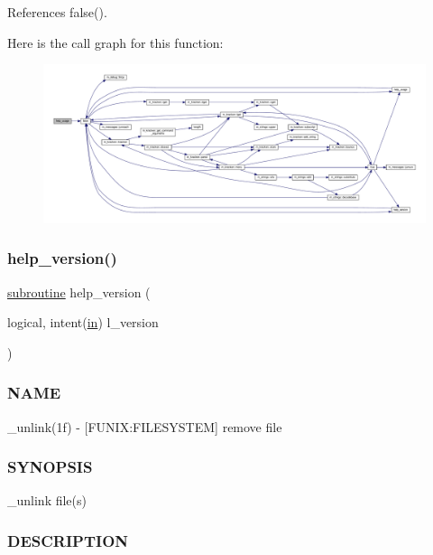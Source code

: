 References false().

Here is the call graph for this function\+:
\nopagebreak
\begin{figure}[H]
\begin{center}
\leavevmode
\includegraphics[width=350pt]{__unlink_8f90_a3e09a3b52ee8fb04eeb93fe5761626a8_cgraph}
\end{center}
\end{figure}
\mbox{\label{__unlink_8f90_a39c21619b08a3c22f19e2306efd7f766}} 
\subsubsection{\texorpdfstring{help\+\_\+version()}{help\_version()}}
{\footnotesize\ttfamily \hyperlink{M__stopwatch_83_8txt_acfbcff50169d691ff02d4a123ed70482}{subroutine} help\+\_\+version (\begin{DoxyParamCaption}\item[{logical, intent(\hyperlink{M__journal_83_8txt_afce72651d1eed785a2132bee863b2f38}{in})}]{l\+\_\+version }\end{DoxyParamCaption})}



\subsubsection*{N\+A\+ME}

\+\_\+unlink(1f) -\/ \mbox{[}F\+U\+N\+IX\+:F\+I\+L\+E\+S\+Y\+S\+T\+EM\mbox{]} remove file \subsubsection*{S\+Y\+N\+O\+P\+S\+IS}

\+\_\+unlink file(s) \subsubsection*{D\+E\+S\+C\+R\+I\+P\+T\+I\+ON}

